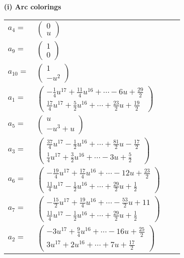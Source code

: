\documentclass[1p]{elsarticle_modified}
\theoremstyle{definition}
\begin{document}
\flushleft \textbf{(i) Arc colorings}\\
\begin{tabular}{m{7pt} m{180pt} m{7pt} m{180pt} }
\flushright $a_{4}=$&$\begin{pmatrix}0\\u\end{pmatrix}$ \\
\flushright $a_{9}=$&$\begin{pmatrix}1\\0\end{pmatrix}$ \\
\flushright $a_{10}=$&$\begin{pmatrix}1\\- u^2\end{pmatrix}$ \\
\flushright $a_{1}=$&$\begin{pmatrix}-\frac{1}{4} u^{17}+\frac{11}{4} u^{16}+\cdots-6 u+\frac{29}{2}\\\frac{17}{4} u^{17}+\frac{5}{2} u^{16}+\cdots+\frac{23}{2} u+\frac{19}{2}\end{pmatrix}$ \\
\flushright $a_{5}=$&$\begin{pmatrix}u\\- u^3+u\end{pmatrix}$ \\
\flushright $a_{3}=$&$\begin{pmatrix}\frac{37}{4} u^{17}-\frac{1}{2} u^{16}+\cdots+\frac{81}{2} u-\frac{17}{2}\\\frac{1}{4} u^{17}+\frac{3}{2} u^{16}+\cdots-3 u+\frac{5}{2}\end{pmatrix}$ \\
\flushright $a_{6}=$&$\begin{pmatrix}-\frac{19}{4} u^{17}+\frac{17}{4} u^{16}+\cdots-12 u+\frac{23}{2}\\\frac{11}{4} u^{17}-\frac{1}{2} u^{16}+\cdots+\frac{29}{2} u+\frac{1}{2}\end{pmatrix}$ \\
\flushright $a_{7}=$&$\begin{pmatrix}-\frac{15}{2} u^{17}+\frac{19}{4} u^{16}+\cdots-\frac{53}{2} u+11\\\frac{11}{4} u^{17}-\frac{1}{2} u^{16}+\cdots+\frac{29}{2} u+\frac{1}{2}\end{pmatrix}$ \\
\flushright $a_{2}=$&$\begin{pmatrix}-3 u^{17}+\frac{9}{4} u^{16}+\cdots-16 u+\frac{25}{2}\\3 u^{17}+2 u^{16}+\cdots+7 u+\frac{17}{2}\end{pmatrix}$ \\

\end{tabular}
\end{document}
